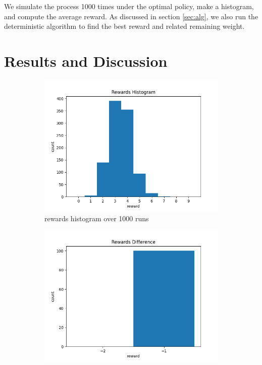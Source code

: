 
We simulate the process 1000 times under the optimal policy, make a
histogram, and compute the average reward. As discussed in section \ref{sec:alg}, we also run the deterministic algorithm to find the best reward and related remaining weight. 


\section{Results and Discussion}
\begin{figure}[htbp]
    \centering
    \begin{subfigure}[htbp]{0.25\textwidth}
        \centering
        \includegraphics[width=\textwidth]{fig/asg1_reward_hist.png}
        \caption{rewards histogram over 1000 runs}
        \label{fig:fig_1}
    \end{subfigure}
    \hfill
    \begin{subfigure}[htbp]{0.25\textwidth}
        \centering
        \includegraphics[width=\textwidth]{fig/asg1_reward_diff.png}

\end{subfigure}
\end{figure}
